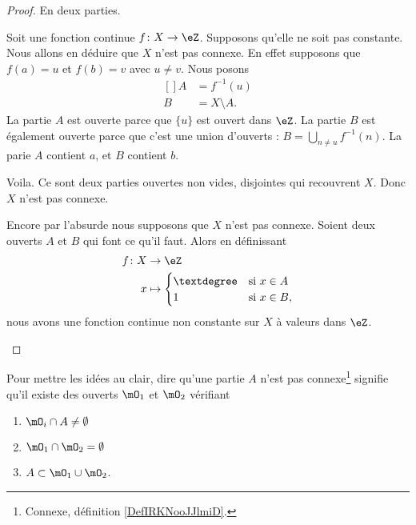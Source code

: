 \begin{proof}
	En deux parties.
	\begin{subproof}
		\spitem[\( \Rightarrow\)]
		Soit une fonction continue \(f \colon X\to \eZ  \). Supposons qu'elle ne soit pas constante. Nous allons en déduire que \( X\) n'est pas connexe. En effet supposons que \( f(a)=u\) et \( f(b)=v\) avec \( u\neq v\). Nous posons
		\begin{equation}
			\begin{aligned}[]
				A & =f^{-1}(u)     \\
				B & =X\setminus A.
			\end{aligned}
		\end{equation}
		La partie \( A\) est ouverte parce que \( \{ u \}\) est ouvert dans \( \eZ\). La partie \( B\) est également ouverte parce que c'est une union d'ouverts :  \( B=\bigcup_{n\neq u}f^{-1}(n)\). La parie \( A\) contient \( a\), et \( B\) contient \( b\).

		Voila. Ce sont deux parties ouvertes non vides, disjointes qui recouvrent \( X\). Donc \( X\) n'est pas connexe.

		\spitem[\( \Leftarrow\)]
		Encore par l'absurde nous supposons que \( X\) n'est pas connexe. Soient deux ouverts \( A\) et \( B\) qui font ce qu'il faut. Alors en définissant
		\begin{equation}
			\begin{aligned}
				f\colon X & \to \eZ                       \\
				x         & \mapsto \begin{cases}
					                    ° & \text{si } x\in A \\
					                    1 & \text{si }x\in B,
				                    \end{cases}
			\end{aligned}
		\end{equation}
		nous avons une fonction continue non constante sur \( X\) à valeurs dans \( \eZ\).
	\end{subproof}
\end{proof}

\begin{normaltext}      \label{NORMooSCAWooPFnrVj}
	Pour mettre les idées au clair, dire qu'une partie \( A\) n'est pas connexe\footnote{Connexe, définition \ref{DefIRKNooJJlmiD}.} signifie qu'il existe des ouverts \( \mO_1\) et \( \mO_2\) vérifiant
	\begin{enumerate}
		\item   \label{ITEMooRACDooKLaVXP}
		      \( \mO_i\cap A\neq\emptyset\)
		\item       \label{ITEMooNCQVooNjAYCT}
		      \( \mO_1\cap\mO_2=\emptyset\)
		\item       \label{ITEMooPIHJooNJYpQo}
		      \( A\subset  \mO_1\cup\mO_2  \).
	\end{enumerate}
\end{normaltext}

